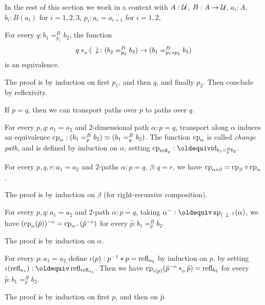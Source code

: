 \documentclass[a4paper,12pt]{amsart}
\begin{document}
In the rest of this section we work in a context with
$A : \mathcal{U}$, $B : A \to \mathcal{U}$, $a_i:A$, $b_i:B(a_i)$ for $i=1,2,3$,
$p_i : a_i = a_{i+1}$ for $i=1,2$,

\begin{lemma}\label{lem:compo-over}
  For every $q : b_1 =^B_{p_1} b_2$, the
  function
  \[
    q \cto ({\blank}) : (b_2 =^B_{p_2} b_3) \to (b_1 =^B_{p_1\ct p_2} b_3)
  \]
  is an equivalence.
\end{lemma}
The proof is by induction on first $p_1$, and then $q$, and finally $p_2$.
Then conclude by reflexivity.

If $p=q$, then we can transport paths over $p$ to paths over $q$.

\begin{definition}\label{def:pathover-change-path}
  For every $p,q:a_1=a_2$ and $2$-dimensional path $\alpha : p = q$,
  transport along $\alpha$
  induces an equivalence $\mathrm{cp}_{\alpha}: (b_1 =^B_p b_2) \simeq (b_1 =^B_q b_2)$.
  The function $\mathrm{cp}_{\alpha}$ is called \emph{change path}, and is defined
  by induction on $\alpha$, setting $\cp{\refl{p}}\defeq \id_{b_1 =^B_p b_2}$.
\end{definition}

\begin{lemma}\label{lem:functorial-change-path}
  For every $p,q,r:a_1=a_2$ and 2-paths $\alpha : p = q$, $\beta : q = r$,
  we have $\mathrm{cp}_{\alpha*\beta}=\mathrm{cp}_{\beta}\circ\mathrm{cp}_{\alpha}$.
\end{lemma}

The proof is by induction on $\beta$ (for right-recursive composition).

\begin{lemma}\label{lem:inv2-change-path}
  For every  $p,q:a_1=a_2$ and 2-path $\alpha : p = q$, taking
  $\alpha^- \defeq \ap{(\blank)^{-1}}(\alpha)$, we have
  $(\mathrm{cp}_{\alpha}(\hat p))^{-\mathrm{o}} = \mathrm{cp}_{\alpha^-}(\hat p^{-\mathrm{o}})$
  for every $\hat p: b_1=^B_p b_2$.
\end{lemma}
 The proof is by induction on $\alpha$.

\begin{lemma}\label{lem:invlaw-change-path}
  For every  $p :a_1 = a_2$ define $\iota(p): p^{-1}* p = \mathop{{\mathrm{refl}}_{a_2}}$
  by induction on $p$, by setting $\iota(\refl{a_1})\defeq \refl{\refl{a_1}}$.
  Then we have $\cp{\iota(p)}(\hat p\invo \cto {\hat p}) = \refl{b_2}$
  for every $\hat p: b_1=^B_p b_2$.
\end{lemma}
 The proof is by induction on first $p$, and then on $\hat p$.
\end{document}
